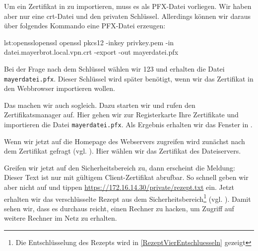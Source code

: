 
Um ein Zertifikat in \Firefox{} zu importieren, muss es als PFX-Datei
vorliegen. Wir haben aber nur eine crt-Datei und den privaten
Schlüssel. Allerdings können wir daraus über folgendes Kommando eine PFX-Datei
erzeugen:

\begin{MetasploitCode}{lst:openssl}{openssl}
openssl pkcs12 -inkey privkey.pem -in datei.mayerbrot.local.vpn.crt -export -out mayerdatei.pfx
\end{MetasploitCode}

Bei der Frage nach dem Schlüssel wählen wir 123 und erhalten die Datei
\texttt{mayerdatei.pfx}. Dieser Schlüssel wird später benötigt, wenn wir das
Zertifikat in den Webbrowser importieren wollen.

Das machen wir auch sogleich. Dazu starten wir \Firefox{} und rufen den
Zertifikatsmanager auf. Hier gehen wir zur Registerkarte \glqq{}Ihre
Zertifikate\grqq{} und importieren die Datei \texttt{mayerdatei.pfx}. Als
Ergebnis erhalten wir das Fenster in .


Wenn wir jetzt auf die Homepage des Webservers zugreifen wird zunächst nach dem
Zertifikat gefragt (vgl. ). Hier wählen wir das
Zertifikat des Dateiservers.


Greifen wir jetzt auf den Sicherheitsbereich zu, dann erscheint die Meldung:
\glqq{}Dieser Text ist nur mit gültigem Client-Zertifikat abrufbar\grqq{}. So
schnell geben wir aber nicht auf und tippen
\url{https://172.16.14.30/private/rezept.txt} ein. Jetzt erhalten wir das
verschlüsselte Rezept aus dem Sicherheitsbereich\footnote{Die Entschlüsselung
  des Rezepts wird in \cref{RezeptVierEntschluesseln} gezeigt}
(vgl. ). Damit sehen wir, dass es durchaus reicht,
einen Rechner zu hacken, um Zugriff auf weitere Rechner im Netz zu erhalten.





